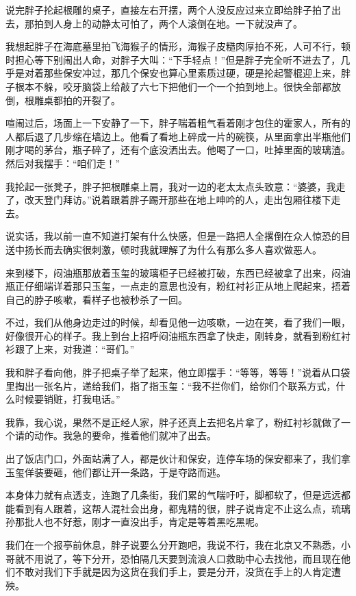 说完胖子抡起根雕的桌子，直接左右开摆，两个人没反应过来立即给胖子拍了出去，那拍到人身上的动静太可怕了，两个人滚倒在地。一下就没声了。

我想起胖子在海底墓里拍飞海猴子的情形，海猴子皮糙肉厚拍不死，人可不行，顿时担心等下别闹出人命，对胖子大叫：“下手轻点！”但是胖子完全听不进去了，几乎是对着那些保安冲过，那几个保安也算心里素质过硬，硬是抡起警棍迎上来，胖子根本不躲，咬牙脑袋上给敲了六七下把他们一个一个拍到地上。很快全部都放倒，根雕桌都拍的开裂了。

喧闹过后，场面上一下安静了一下，胖子喘着粗气看着刚才包住的霍家人，所有的人都后退了几步缩在墙边上。他看了看地上碎成一片的碗筷，从里面拿出半瓶他们刚才喝的茅台，瓶子碎了，还有个底没洒出去。他喝了一口，吐掉里面的玻璃渣。然后对我摆手：“咱们走！”

我抡起一张凳子，胖子把根雕桌上肩，我对一边的老太太点头致意：“婆婆，我走了，改天登门拜访。”说着跟着胖子踢开那些在地上呻吟的人，走出包厢往楼下走去。

说实话，我以前一直不知道打架有什么快感，但是一路把人全撂倒在众人惊恐的目送中扬长而去确实很刺激，顿时我就理解了为什么有那么多人喜欢做恶人。

来到楼下，闷油瓶那放着玉玺的玻璃柜子已经被打破，东西已经被拿了出来，闷油瓶正仔细端详着那只玉玺，一点走的意思也没有，粉红衬衫正从地上爬起来，捂着自己的脖子咳嗽，看样子也被秒杀了一回。

不过，我们从他身边走过的时候，却看见他一边咳嗽，一边在笑，看了我们一眼，好像很开心的样子。我上到台上招呼闷油瓶东西拿了快走，刚转身，就看到粉红衬衫跟了上来，对我道：“哥们。”

我和胖子看向他，胖子把桌子举了起来，他立即摆手：“等等，等等！”说着从口袋里掏出一张名片，递给我们，指了指玉玺：“我不拦你们，给你们个联系方式，什么时候要销赃，打我电话。”

我靠，我心说，果然不是正经人家，胖子还真上去把名片拿了，粉红衬衫就做了一个请的动作。我急的要命，推着他们就冲了出去。

出了饭店门口，外面站满了人，都是伙计和保安，连停车场的保安都来了，我们拿玉玺佯装要砸，他们都让开一条路，于是夺路而逃。

本身体力就有点透支，连跑了几条街，我们累的气喘吁吁，脚都软了，但是远远都能看到有人跟着，这帮人混社会出身，都鬼精的很，胖子说肯定不止这么点，琉璃孙那批人也不好惹，刚才一直没出手，肯定是等着黑吃黑呢。

我们在一个报亭前休息，胖子说要么分开跑吧，我说不行，我在北京又不熟悉，小哥就不用说了，等下分开，恐怕隔几天要到流浪人口救助中心去找他，而且现在他们不敢对我们下手就是因为这货在我们手上，要是分开，没货在手上的人肯定遭殃。

